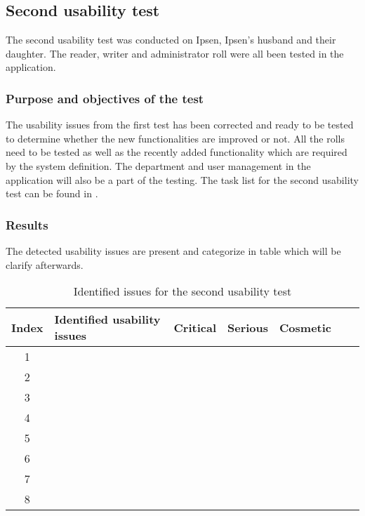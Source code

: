 

\subsection{Second usability test}
The second usability test was conducted on Ipsen, Ipsen's husband and their daughter. 
The reader, writer and administrator roll were all been tested in the application.

\subsubsection{Purpose and objectives of the test}
The usability issues from the first test has been corrected and ready to be tested to determine whether the new functionalities are improved or not. 
All the rolls need to be tested as well as the recently added functionality which are required by the system definition. 
The department and user management in the application will also be a part of the testing. The task list for the second usability test can be found in .

\subsubsection{Results}

The detected usability issues are present and categorize in table 
 which will be clarify afterwards. 

\begin{table}[H]
	\begin{center}
	\begin{tabular}{| c | m{21em} | c | c | c | c | c |}
		\hline
		Index & \textbf{Identified usability issues} & Critical  & Serious & Cosmetic \\
		\hline
		 1 &  &  &  &  \\
		\hline
		 2 &  &  &  & \\
		\hline
		 3 &  & & &  \\
		\hline
		4 & &  & & \\
		\hline
		5 & &  &  &  \\
		\hline
		6 & &  &  & \\
		\hline
		7 &  & & &  \\
		\hline
		8 &  &  &  &  \\
		\hline
	\end{tabular}
	\end{center}
	\caption{Identified issues for the second usability test}\label{tab:utest2}
\end{table}

